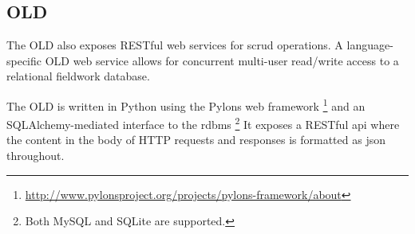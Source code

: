 \documentclass[11pt]{article}
\begin{document}
%
%

\subsection{OLD}\label{sec:old}

The OLD also exposes RESTful web services for \gls{scrud} operations. 
A language-specific OLD web service allows for concurrent
multi-user read/write access to a relational fieldwork database. 




The OLD is written in Python using the Pylons web framework%
\footnote{\url{http://www.pylonsproject.org/projects/pylons-framework/about}} %
and an SQLAlchemy-mediated interface to the \gls{rdbms}%
\footnote{Both MySQL and SQLite are supported.} %
It exposes a RESTful \gls{api} where the content in the body of HTTP 
requests and responses is formatted as \gls{json} throughout.%
\end{document}
